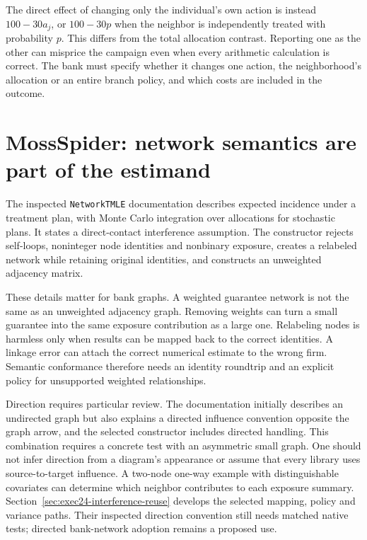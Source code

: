 The direct effect of changing only the individual's own action is instead
$100-30a_j$, or $100-30p$ when the neighbor is independently treated with
probability $p$. This differs from the total allocation contrast. Reporting
one as the other can misprice the campaign even when every arithmetic
calculation is correct. The bank must specify whether it changes one action,
the neighborhood's allocation or an entire branch policy, and which costs
are included in the outcome.

\section{MossSpider: network semantics are part of the estimand}

The inspected \texttt{NetworkTMLE} documentation describes expected incidence
under a treatment plan, with Monte Carlo integration over allocations for
stochastic plans. It states a direct-contact interference assumption. The
constructor rejects self-loops, noninteger node identities and nonbinary
exposure, creates a relabeled network while retaining original identities,
and constructs an unweighted adjacency matrix. \cite{v13_sw_mossspider}

These details matter for bank graphs. A weighted guarantee network is not the
same as an unweighted adjacency graph. Removing weights can turn a small
guarantee into the same exposure contribution as a large one. Relabeling nodes
is harmless only when results can be mapped back to the correct identities.
A linkage error can attach the correct numerical estimate to the wrong firm.
Semantic conformance therefore needs an identity roundtrip and an explicit
policy for unsupported weighted relationships.

Direction requires particular review. The documentation initially describes an
undirected graph but also explains a directed influence convention opposite
the graph arrow, and the selected constructor includes directed handling. This
combination requires a concrete test with an asymmetric small graph. One should
not infer direction from a diagram's appearance or assume that every library
uses source-to-target influence. A two-node one-way example with distinguishable
covariates can determine which neighbor contributes to each exposure summary.
Section~\ref{sec:exec24-interference-reuse} develops the selected mapping,
policy and variance paths. Their inspected direction convention still needs
matched native tests; directed bank-network adoption remains a proposed use. \cite{v13_sw_mossspider}

